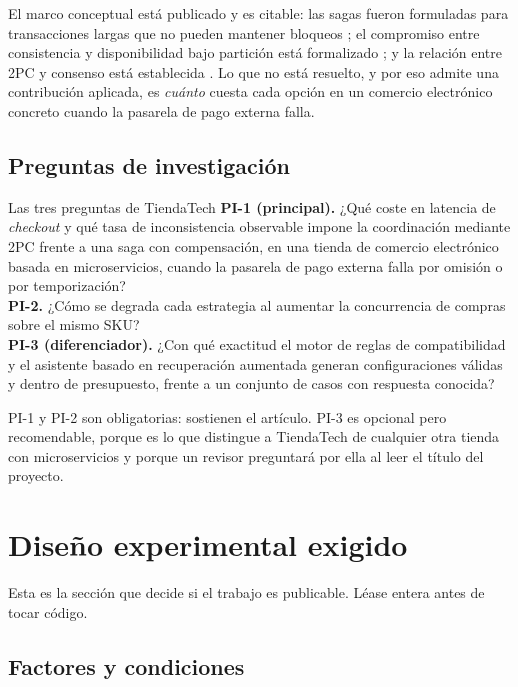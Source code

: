 \documentclass[11pt,a4paper]{article}
\begin{document}
El marco conceptual está publicado y es citable: las sagas fueron formuladas para transacciones largas que no pueden mantener bloqueos \cite{garciamolina1987sagas}; el compromiso entre consistencia y disponibilidad bajo partición está formalizado \cite{gilbert2002brewer}; y la relación entre 2PC y consenso está establecida \cite{gray2006consensus}. Lo que no está resuelto, y por eso admite una contribución aplicada, es \emph{cuánto} cuesta cada opción en un comercio electrónico concreto cuando la pasarela de pago externa falla.

\subsection{Preguntas de investigación}

\begin{aviso}{Las tres preguntas de TiendaTech}
	\textbf{PI-1 (principal).} ¿Qué coste en latencia de \emph{checkout} y qué tasa de inconsistencia observable impone la coordinación mediante 2PC frente a una saga con compensación, en una tienda de comercio electrónico basada en microservicios, cuando la pasarela de pago externa falla por omisión o por temporización?\\[6pt]
	\textbf{PI-2.} ¿Cómo se degrada cada estrategia al aumentar la concurrencia de compras sobre el mismo SKU?\\[6pt]
	\textbf{PI-3 (diferenciador).} ¿Con qué exactitud el motor de reglas de compatibilidad y el asistente basado en recuperación aumentada generan configuraciones válidas y dentro de presupuesto, frente a un conjunto de casos con respuesta conocida?
\end{aviso}

PI-1 y PI-2 son obligatorias: sostienen el artículo. PI-3 es opcional pero recomendable, porque es lo que distingue a TiendaTech de cualquier otra tienda con microservicios y porque un revisor preguntará por ella al leer el título del proyecto.

\section{Diseño experimental exigido}

Esta es la sección que decide si el trabajo es publicable. Léase entera antes de tocar código.

\subsection{Factores y condiciones}
\end{document}
